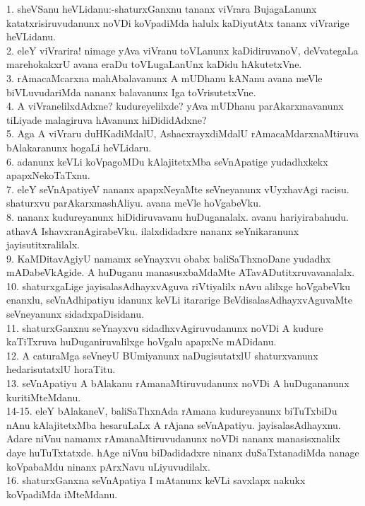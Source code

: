 \documentclass{article}
\begin{document}
1. sheVSanu heVLidanu:-shaturxGanxnu tananx viVrara BujagaLanunx katatxrisiruvudanunx noVDi koVpadiMda halulx kaDiyutAtx tananx viVrarige heVLidanu.\\
2. eleY viVrarira! nimage yAva viVranu toVLanunx kaDidiruvanoV, deVvategaLa marehokakxrU avana eraDu toVLugaLanUnx kaDidu hAkutetxVne.\\
3. rAmacaMcarxna mahAbalavanunx A mUDhanu kANanu avana meVle biVLuvudariMda nananx balavanunx Iga toVrisutetxVne.\\
4. A viVranelilxdAdxne? kudureyelilxde? yAva mUDhanu parAkarxmavanunx tiLiyade malagiruva hAvanunx hiDididAdxne?\\
5. Aga A viVraru duHKadiMdalU, AshacxrayxdiMdalU rAmacaMdarxnaMtiruva bAlakaranunx hogaLi heVLidaru.\\
6. adanunx keVLi koVpagoMDu kAlajitetxMba seVnApatige yudadhxkekx apapxNekoTaTxnu.\\
7. eleY seVnApatiyeV nananx apapxNeyaMte seVneyanunx vUyxhavAgi racisu. shaturxvu parAkarxmashAliyu. avana meVle hoVgabeVku.\\
8. nananx kudureyanunx hiDidiruvavanu huDuganalalx. avanu hariyirabahudu. athavA IshavxranAgirabeVku. ilalxdidadxre nananx seYnikaranunx jayisutitxralilalx.\\
9. KaMDitavAgiyU namamx seYnayxvu obabx baliSaThxnoDane yudadhx mADabeVkAgide. A huDuganu manasusxbaMdaMte ATavADutitxruvavanalalx.\\
10. shaturxgaLige jayisalasAdhayxvAguva riVtiyalilx nAvu alilxge hoVgabeVku enanxlu, seVnAdhipatiyu idanunx keVLi itararige BeVdisalasAdhayxvAguvaMte seVneyanunx sidadxpaDisidanu.\\
11. shaturxGanxnu seYnayxvu sidadhxvAgiruvudanunx noVDi A kudure kaTiTxruva huDuganiruvalilxge hoVgalu apapxNe mADidanu.\\
12. A caturaMga seVneyU BUmiyanunx naDugisutatxlU shaturxvanunx hedarisutatxlU horaTitu.\\
13. seVnApatiyu A bAlakanu rAmanaMtiruvudanunx noVDi A huDugananunx kuritiMteMdanu.\\
14-15. eleY bAlakaneV, baliSaThxnAda rAmana kudureyanunx biTuTxbiDu nAnu kAlajitetxMba hesaruLaLx A rAjana seVnApatiyu. jayisalasAdhayxnu. Adare niVnu namamx rAmanaMtiruvudanunx noVDi nananx manasisxnalilx daye huTuTxtatxde. hAge niVnu biDadidadxre ninanx duSaTxtanadiMda nanage koVpabaMdu ninanx pArxNavu uLiyuvudilalx.\\
16. shaturxGanxna seVnApatiya I mAtanunx keVLi savxlapx nakukx koVpadiMda iMteMdanu.\\
\end{document}
